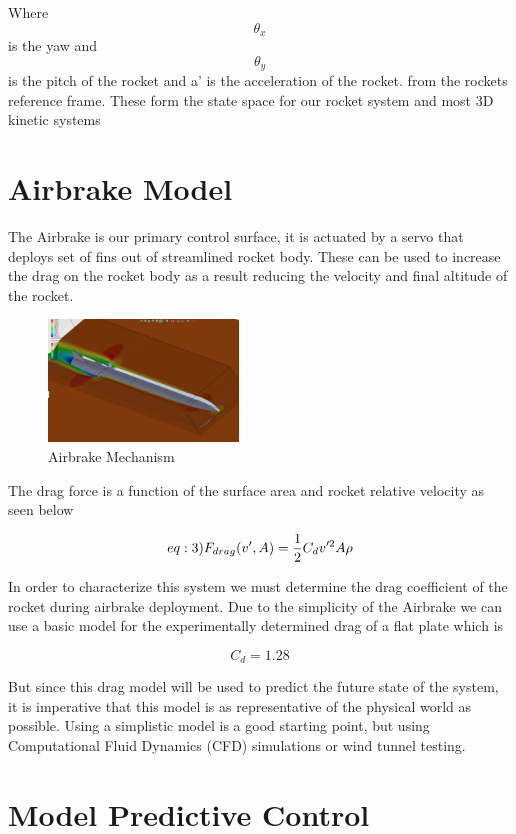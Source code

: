 \documentclass[conference, letterpaper]{IEEEtran}
\begin{document}
Where $$\theta_x$$ is the yaw and $$\theta_y$$ is the pitch of the rocket and a' is the acceleration of the rocket.
from the rockets reference frame. These form the state space for our rocket system and most 3D kinetic systems

\section{Airbrake Model}
The Airbrake is our primary control surface, it is actuated by a servo that deploys
set of fins out of streamlined rocket body.  These can be used to increase the drag on
the rocket body as a result reducing the velocity and final altitude of the rocket.

\begin{figure}[H]
\centering
\includegraphics[width=0.45\textwidth]{./airbrake_mechanism}
\caption{Airbrake Mechanism}
\label{fig:airbrake_mechanism}
\end{figure}

The drag force is a function of the surface area and rocket relative velocity as seen below

\begin{equation}  \label(eq:3)
  F_{drag}(v', A)=\frac{1}{2}C_dv'^2A\rho
\end{equation}

In order to characterize this system we must determine the drag coefficient of the rocket
during airbrake deployment.  Due to the simplicity of the Airbrake we can use a basic
model for the experimentally determined drag of a flat plate\cite{nasa} which is

\begin{equation}
  C_d=1.28
\end{equation}

But since this drag model will be used to predict the future state of the system, it is
imperative that this model is as representative of the physical world as possible.  Using
a simplistic model is a good starting point, but using Computational Fluid Dynamics (CFD)
simulations or wind tunnel testing.

\section{Model Predictive Control}
\end{document}
